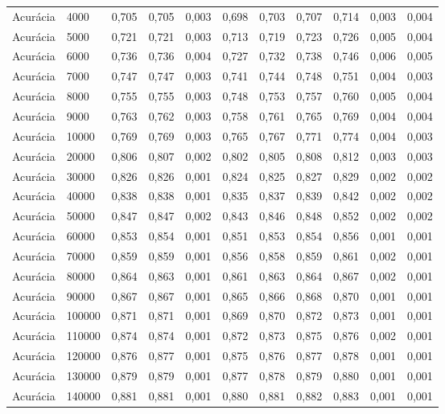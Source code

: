 \begin{longtable}{@{}llrrrrrrrrr@{}}
Acurácia & 4000 & 0,705 & 0,705 & 0,003 & 0,698 & 0,703 & 0,707 & 0,714 & 0,003 & 0,004 \\
Acurácia & 5000 & 0,721 & 0,721 & 0,003 & 0,713 & 0,719 & 0,723 & 0,726 & 0,005 & 0,004 \\
Acurácia & 6000 & 0,736 & 0,736 & 0,004 & 0,727 & 0,732 & 0,738 & 0,746 & 0,006 & 0,005 \\
Acurácia & 7000 & 0,747 & 0,747 & 0,003 & 0,741 & 0,744 & 0,748 & 0,751 & 0,004 & 0,003 \\
Acurácia & 8000 & 0,755 & 0,755 & 0,003 & 0,748 & 0,753 & 0,757 & 0,760 & 0,005 & 0,004 \\
Acurácia & 9000 & 0,763 & 0,762 & 0,003 & 0,758 & 0,761 & 0,765 & 0,769 & 0,004 & 0,004 \\
Acurácia & 10000 & 0,769 & 0,769 & 0,003 & 0,765 & 0,767 & 0,771 & 0,774 & 0,004 & 0,003 \\
Acurácia & 20000 & 0,806 & 0,807 & 0,002 & 0,802 & 0,805 & 0,808 & 0,812 & 0,003 & 0,003 \\
Acurácia & 30000 & 0,826 & 0,826 & 0,001 & 0,824 & 0,825 & 0,827 & 0,829 & 0,002 & 0,002 \\
Acurácia & 40000 & 0,838 & 0,838 & 0,001 & 0,835 & 0,837 & 0,839 & 0,842 & 0,002 & 0,002 \\
Acurácia & 50000 & 0,847 & 0,847 & 0,002 & 0,843 & 0,846 & 0,848 & 0,852 & 0,002 & 0,002 \\
Acurácia & 60000 & 0,853 & 0,854 & 0,001 & 0,851 & 0,853 & 0,854 & 0,856 & 0,001 & 0,001 \\
Acurácia & 70000 & 0,859 & 0,859 & 0,001 & 0,856 & 0,858 & 0,859 & 0,861 & 0,002 & 0,001 \\
Acurácia & 80000 & 0,864 & 0,863 & 0,001 & 0,861 & 0,863 & 0,864 & 0,867 & 0,002 & 0,001 \\
Acurácia & 90000 & 0,867 & 0,867 & 0,001 & 0,865 & 0,866 & 0,868 & 0,870 & 0,001 & 0,001 \\
Acurácia & 100000 & 0,871 & 0,871 & 0,001 & 0,869 & 0,870 & 0,872 & 0,873 & 0,001 & 0,001 \\
Acurácia & 110000 & 0,874 & 0,874 & 0,001 & 0,872 & 0,873 & 0,875 & 0,876 & 0,002 & 0,001 \\
Acurácia & 120000 & 0,876 & 0,877 & 0,001 & 0,875 & 0,876 & 0,877 & 0,878 & 0,001 & 0,001 \\
Acurácia & 130000 & 0,879 & 0,879 & 0,001 & 0,877 & 0,878 & 0,879 & 0,880 & 0,001 & 0,001 \\
Acurácia & 140000 & 0,881 & 0,881 & 0,001 & 0,880 & 0,881 & 0,882 & 0,883 & 0,001 & 0,001 \\

\end{longtable}
